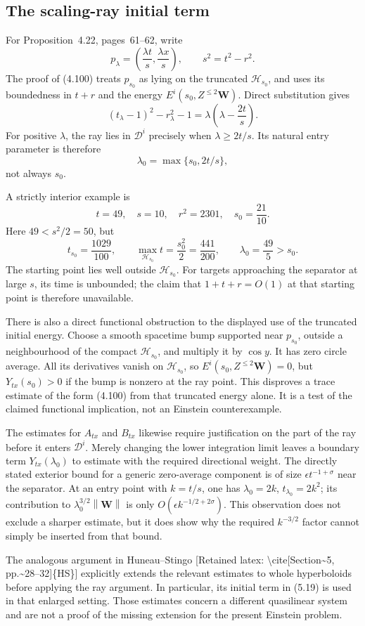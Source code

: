 \documentclass[10pt]{article}
\begin{document}
\subsection*{The scaling-ray initial term}
For Proposition 4.22, pages 61–62, write \[p_\lambda=\left(\frac{\lambda t}{s},\frac{\lambda x}{s}\right),
 \qquad s^2=t^2-r^2.\] The proof of (4.100) treats \(p_{s_0}\) as lying on the truncated \(\mathcal H_{s_0}\), and uses its boundedness in \(t+r\) and the energy \(E^i(s_0,Z^{\leq2}\mathbf W)\). Direct substitution gives \[(t_\lambda-1)^2-r_\lambda^2-1
 =\lambda\left(\lambda-\frac{2t}{s}\right).\] For positive \(\lambda\), the ray lies in \(\mathcal D^i\) precisely when \(\lambda\geq2t/s\). Its natural entry parameter is therefore \[\lambda_0=\max\{s_0,2t/s\},\] not always \(s_0\).\par
A strictly interior example is \[t=49,\quad s=10,\quad r^2=2301,\quad s_0=\frac{21}{10}.\] Here \(49<s^2/2=50\), but \[t_{s_0}=\frac{1029}{100},
 \qquad
 \max_{\mathcal H_{s_0}}t=\frac{s_0^2}{2}=\frac{441}{200},
 \qquad
 \lambda_0=\frac{49}{5}>s_0.\] The starting point lies well outside \(\mathcal H_{s_0}\). For targets approaching the separator at large \(s\), its time is unbounded; the claim that \(1+t+r=O(1)\) at that starting point is therefore unavailable.\par
There is also a direct functional obstruction to the displayed use of the truncated initial energy. Choose a smooth spacetime bump supported near \(p_{s_0}\), outside a neighbourhood of the compact \(\mathcal H_{s_0}\), and multiply it by \(\cos y\). It has zero circle average. All its derivatives vanish on \(\mathcal H_{s_0}\), so \(E^i(s_0,Z^{\leq2}\mathbf W)=0\), but \(Y_{tx}(s_0)>0\) if the bump is nonzero at the ray point. This disproves a trace estimate of the form (4.100) from that truncated energy alone. It is a test of the claimed functional implication, not an Einstein counterexample.\par
The estimates for \(A_{tx}\) and \(B_{tx}\) likewise require justification on the part of the ray before it enters \(\mathcal D^i\). Merely changing the lower integration limit leaves a boundary term \(Y_{tx}(\lambda_0)\) to estimate with the required directional weight. The directly stated exterior bound for a generic zero-average component is of size \(\epsilon t^{-1+\sigma}\) near the separator. At an entry point with \(k=t/s\), one has \(\lambda_0=2k\), \(t_{\lambda_0}=2k^2\); its contribution to \(\lambda_0^{3/2}\left\|\mathbf W\right\|\) is only \(O(\epsilon k^{-1/2+2\sigma})\). This observation does not exclude a sharper estimate, but it does show why the required \(k^{-3/2}\) factor cannot simply be inserted from that bound.\par
The analogous argument in Huneau–Stingo [Retained latex: \textbackslash{}cite[Section\textasciitilde{}5, pp.\textasciitilde{}28--32]\{HS\}] explicitly extends the relevant estimates to whole hyperboloids before applying the ray argument. In particular, its initial term in (5.19) is used in that enlarged setting. Those estimates concern a different quasilinear system and are not a proof of the missing extension for the present Einstein problem.\par
\end{document}
